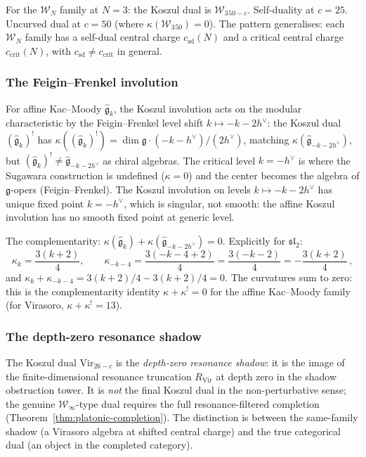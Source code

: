 For the $\mathcal W_N$ family at $N=3$: the Koszul dual is
$\mathcal W_3{}_{50-c}$. Self-duality at $c=25$. Uncurved dual at
$c=50$ (where $\kappa(\mathcal W_3{}_{50})=0$). The pattern
generalises: each $\mathcal W_N$ family has a self-dual central
charge $c_{\mathrm{sd}}(N)$ and a critical central charge
$c_{\mathrm{crit}}(N)$, with
$c_{\mathrm{sd}}\neq c_{\mathrm{crit}}$ in general.

\subsubsection*{The Feigin--Frenkel involution}

For affine Kac--Moody $\widehat{\mathfrak g}_k$, the Koszul
involution acts on the modular characteristic by the
Feigin--Frenkel level shift $k\mapsto-k-2h^\vee$:
the Koszul dual $(\widehat{\mathfrak g}_k)^!$
has $\kappa((\widehat{\mathfrak g}_k)^!)
= \dim\mathfrak g\cdot(-k-h^\vee)/(2h^\vee)$,
matching $\kappa(\widehat{\mathfrak g}_{-k-2h^\vee})$,
but $(\widehat{\mathfrak g}_k)^! \neq
\widehat{\mathfrak g}_{-k-2h^\vee}$ as chiral algebras.
The critical level $k=-h^\vee$ is where the
Sugawara construction is undefined ($\kappa = 0$) and the
center becomes the algebra of $\mathfrak g$-opers
(Feigin--Frenkel). The Koszul involution on levels
$k\mapsto -k-2h^\vee$ has unique fixed point $k=-h^\vee$,
which is singular, not smooth: the affine Koszul
involution has no smooth fixed point at generic level.

The complementarity:
$\kappa(\widehat{\mathfrak g}_k)
+\kappa(\widehat{\mathfrak g}_{-k-2h^\vee})=0$.
Explicitly for $\mathfrak{sl}_2$:
\[
\kappa_k=\frac{3(k+2)}{4},
\qquad
\kappa_{-k-4}=\frac{3(-k-4+2)}{4}
=\frac{3(-k-2)}{4}=-\frac{3(k+2)}{4}\,,
\]
and $\kappa_k+\kappa_{-k-4}=3(k+2)/4-3(k+2)/4
=0$. The curvatures sum to zero: this is the
complementarity identity $\kappa+\kappa^!=0$
for the affine Kac--Moody family (for Virasoro,
$\kappa+\kappa^!=13$).

\subsubsection*{The depth-zero resonance shadow}

The Koszul dual $\mathrm{Vir}_{26-c}$ is the
\emph{depth-zero resonance shadow}: it is the image of the
finite-dimensional resonance truncation
$R_{\mathrm{Vir}}$ at depth zero in the shadow obstruction tower. It is
\emph{not} the final Koszul dual in the non-perturbative sense;
the genuine $\mathcal W_\infty$-type dual requires the full
resonance-filtered completion
(Theorem~\ref{thm:platonic-completion}). The distinction is
between the same-family shadow (a Virasoro algebra at shifted
central charge) and the true categorical dual (an object in the
completed category).

